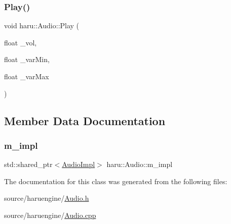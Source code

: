 \subsubsection{\texorpdfstring{Play()}{Play()}\hspace{0.1cm}{\footnotesize\ttfamily [2/2]}}
{\footnotesize\ttfamily void haru\+::\+Audio\+::\+Play (\begin{DoxyParamCaption}\item[{float}]{\+\_\+vol,  }\item[{float}]{\+\_\+var\+Min,  }\item[{float}]{\+\_\+var\+Max }\end{DoxyParamCaption})}



\subsection{Member Data Documentation}
\mbox{\label{classharu_1_1_audio_a5118c3a3f1f33bcaee29dc619e3e68bd}} 
\subsubsection{\texorpdfstring{m\+\_\+impl}{m\_impl}}
{\footnotesize\ttfamily std\+::shared\+\_\+ptr$<$\mbox{\hyperlink{structharu_1_1_audio_impl}{Audio\+Impl}}$>$ haru\+::\+Audio\+::m\+\_\+impl\hspace{0.3cm}{\ttfamily [private]}}



The documentation for this class was generated from the following files\+:\begin{DoxyCompactItemize}
\item 
source/haruengine/\mbox{\hyperlink{_audio_8h}{Audio.\+h}}\item 
source/haruengine/\mbox{\hyperlink{_audio_8cpp}{Audio.\+cpp}}\end{DoxyCompactItemize}
